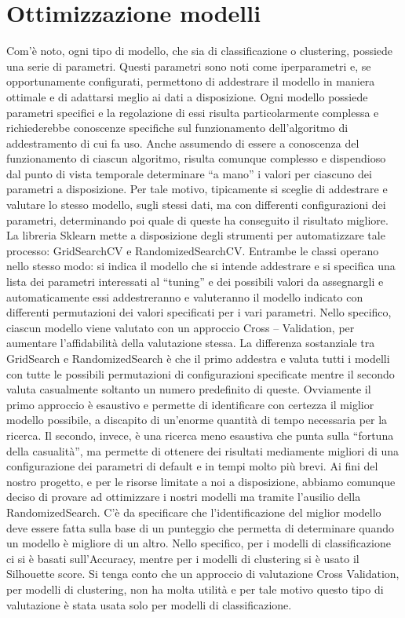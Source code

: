 \documentclass[12pt,oneside]{article}
\begin{document}
\section{Ottimizzazione modelli}\label{ott}
    \begin{justify}
        Com’è noto, ogni tipo di modello, che sia di classificazione o clustering, possiede una serie di parametri. Questi parametri sono noti come iperparametri e, se opportunamente configurati, permettono di addestrare il modello in maniera ottimale e di adattarsi meglio ai dati a disposizione.
        Ogni modello possiede parametri specifici e la regolazione di essi risulta particolarmente complessa e richiederebbe conoscenze specifiche sul funzionamento dell’algoritmo di addestramento di cui fa uso. Anche assumendo di essere a conoscenza del funzionamento di ciascun algoritmo, risulta comunque complesso e dispendioso dal punto di vista temporale determinare “a mano” i valori per ciascuno dei parametri a disposizione.
        Per tale motivo, tipicamente si sceglie di addestrare e valutare lo stesso modello, sugli stessi dati, ma con differenti configurazioni dei parametri, determinando poi quale di queste ha conseguito il risultato migliore. 
        La libreria Sklearn mette a disposizione degli strumenti per automatizzare tale processo: GridSearchCV e RandomizedSearchCV. Entrambe le classi operano nello stesso modo: si indica il modello che si intende addestrare e si specifica una lista dei parametri interessati al “tuning” e dei possibili valori da assegnargli e automaticamente essi addestreranno e valuteranno il modello indicato con differenti permutazioni dei valori specificati per i vari parametri. Nello specifico, ciascun modello viene valutato con un approccio Cross – Validation, per aumentare l’affidabilità della valutazione stessa. La differenza sostanziale tra GridSearch e RandomizedSearch è che il primo addestra e valuta tutti i modelli con tutte le possibili permutazioni di configurazioni specificate mentre il secondo valuta casualmente soltanto un numero predefinito di queste. Ovviamente il primo approccio è esaustivo e permette di identificare con certezza il miglior modello possibile, a discapito di un’enorme quantità di tempo necessaria per la ricerca. Il secondo, invece, è una ricerca meno esaustiva che punta sulla “fortuna della casualità”, ma permette di ottenere dei risultati mediamente migliori di una configurazione dei parametri di default e in tempi molto più brevi.
        Ai fini del nostro progetto, e per le risorse limitate a noi a disposizione, abbiamo comunque deciso di provare ad ottimizzare i nostri modelli ma tramite l’ausilio della RandomizedSearch. C’è da specificare che l’identificazione del miglior modello deve essere fatta sulla base di un punteggio che permetta di determinare quando un modello è migliore di un altro. Nello specifico, per i modelli di classificazione ci si è basati sull’Accuracy, mentre per i modelli di clustering si è usato il Silhouette score. Si tenga conto che un approccio di valutazione Cross Validation, per modelli di clustering, non ha molta utilità e per tale motivo questo tipo di valutazione è stata usata solo per modelli di classificazione.
        \end{justify}
\end{document}
